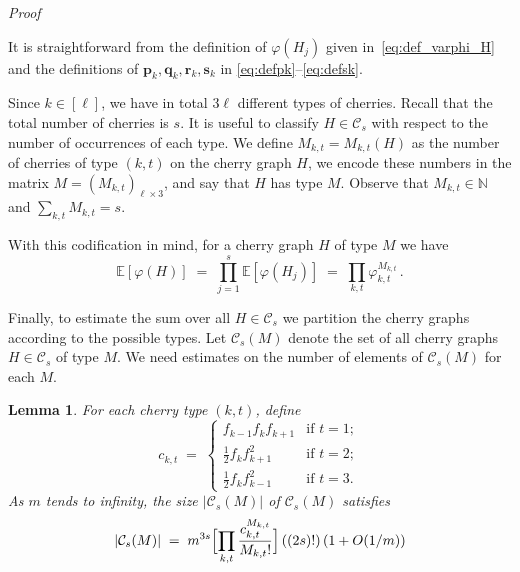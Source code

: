 \documentclass[reqno,a4paper,11pt]{amsart}
\makeatletter
\newtheorem{lemma}{Lemma}
\theoremstyle{remark}
\newcommand{\mc}[1]{{\mathcal #1}}
\newcommand{\mb}[1]{{\mathbf #1}}
\newcommand{\bb}[1]{{\mathbb #1}}
\numberwithin{equation}{section}
\renewenvironment{proof}[1][Proof]{\par
\pushQED{\qed}%
\normalfont \topsep6\p@\@plus6\p@\relax
\trivlist
\item\relax
{\itshape
#1\@addpunct{.}}\hspace\labelsep\ignorespaces
}{%
\popQED\endtrivlist\@endpefalse
}
\makeatother
\begin{document}
\begin{proof}
It is straightforward from the definition of $\varphi(H_j)$ given
in~\eqref{eq:def_varphi_H} and the definitions of $\mb p_k, \mb q_k, \mb r_k,
\mb s_k$ in \eqref{eq:defpk}--\eqref{eq:defsk}.
\end{proof}

Since $k \in [\ell]$, we have in total $3\ell$ different types of cherries. Recall that
the total number of cherries is $s$. It is useful to classify $H \in \mc C_s$
with respect to the number of occurrences of each type. We define $M_{k,t}=M_{k,t}(H)$
as the number of cherries of type $(k,t)$ on the cherry graph $H$, we encode these numbers in the matrix
$M = (M_{k,t})_{\ell \times 3}$, and say that $H$ has type $M$. Observe that $M_{k,t} \in \bb N$ and
$\sum_{k,t} M_{k,t} = s$. 

With this codification in mind, for a cherry graph $H$ of type $M$ we have
\begin{equation}
\label{eq:varphi_cherries_by_type}
\bb E[\varphi(H)]
    \;=\; \prod_{j=1}^{s} \bb E[\varphi(H_j)]
    \;=\; \prod_{k,t} \varphi_{k,t}^{M_{k,t}}\,.
\end{equation}

Finally, to estimate the sum over all $H \in \mc C_s$ we partition the cherry
graphs according to the possible types. Let $\mc C_s(M)$ denote the set of
all cherry graphs $H \in \mc C_s$ of type $M$.
We need estimates on the number of elements of $\mc C_s(M)$ for each $M$.
\begin{lemma}
\label{lema:cherry_graphs_by_type}
For each cherry type $(k,t)$, define
\begin{equation}
\label{eq:def_cherry_constants}
c_{k,t} \;=\;
    \begin{cases}
    f_{k-1} f_k f_{k+1}
        &\text{if $t=1$};\\
    \frac{1}{2} f_{k} f_{k+1}^{2}
        &\text{if $t=2$};\\
    \frac{1}{2} f_{k} f_{k-1}^{2}
        &\text{if $t=3$}.
    \end{cases}
\end{equation}
As $m$ tends to infinity, the size $|\mc C_s(M)|$ of $\mc C_s(M)$ satisfies
\begin{equation}
\label{eq:cherry_graphs_by_type}
|\mc C_s(M)|
    \; = \;   m^{3s}\Bigl[ \prod_{k,t} \frac{c_{k,t}^{M_{k,t}}}{M_{k,t}!}\Bigr]  \left((2s)!\right)(1+O(1/m))
\end{equation}
\end{lemma}
\end{document}
